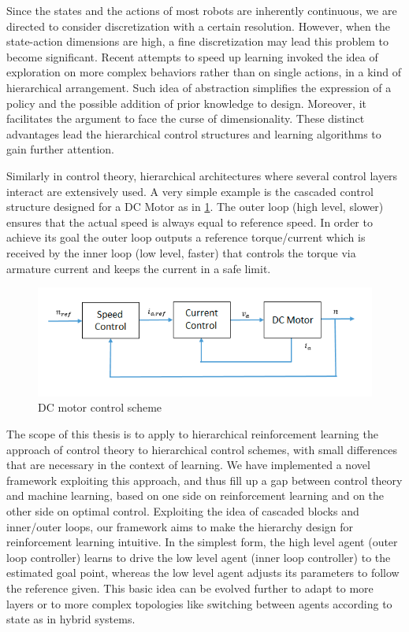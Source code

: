 Since the states and the actions of most robots are inherently continuous, we are directed to consider discretization with a certain resolution. However, when the state-action dimensions are high, a fine  discretization may lead this problem to become significant. Recent attempts to speed up learning invoked the idea of exploration on more complex behaviors rather than on single actions, in a kind of hierarchical arrangement. Such idea of abstraction simplifies the expression of a policy and the possible addition of prior knowledge to design. Moreover, it facilitates the argument to face the curse of dimensionality. These distinct advantages lead the hierarchical control structures and learning algorithms to gain further attention.

Similarly in control theory, hierarchical architectures where several control layers interact are extensively used. A very simple example is the cascaded control structure designed for a DC Motor as in \ref{fig:dcmotorcontrol}. The outer loop (high level, slower) ensures that the actual speed is always equal to reference speed. In order to achieve its goal the outer loop outputs a reference torque/current which is received by the inner loop (low level, faster) that controls the torque via armature current and keeps the current in a safe limit.

\begin{figure}[t]
	\centering
    \includegraphics[width = \textwidth]{./pictures/dcmotorcontrol.png}
    \caption{DC motor control scheme}
    \label{fig:dcmotorcontrol}
\end{figure}

The scope of this thesis is to apply to hierarchical reinforcement learning the approach of control theory to  hierarchical control schemes, with small differences that are necessary in the context of learning. We have implemented a novel framework exploiting this approach, and thus fill up a gap between control theory and machine learning, based on one side on reinforcement learning and on the other side on optimal control. Exploiting the idea of cascaded blocks and inner/outer loops, our framework aims to make the hierarchy design for reinforcement learning intuitive. In the simplest form, the high level agent (outer loop controller) learns to drive the low level agent (inner loop controller) to the estimated goal point, whereas the low level agent adjusts its parameters to follow the reference given. This basic idea can be evolved further to adapt to more layers or to more complex topologies like switching between agents according to state as in hybrid systems.


